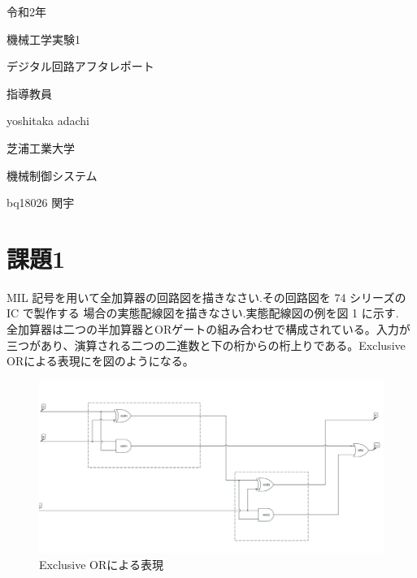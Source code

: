 \documentclass[xelatex,ja=standard,jafont=noto]{bxjsarticle}
\date{May 2020}
\begin{document}
	\begin{titlepage}
			\begin{center}
				
				{\Large 令和2年}
				
				\vspace{10truept}
				
				{\Large 機械工学実験1}
				
				\vspace*{140truept}
				
				{\Huge デジタル回路アフタレポート} 
				
				\vspace{160truept}
				
				{\Large 指導教員}
				
				\vspace{10truept}
				
				{\Large yoshitaka adachi}
				
				\vspace{70truept}
				
				{\Large 芝浦工業大学}
				
				\vspace{10truept}
				
				{\Large 機械制御システム}
				
				\vspace{30truept}
				
				{\Large bq18026 関宇}      
				
			\end{center}
		\end{titlepage}








\section{課題1}
MIL 記号を用いて全加算器の回路図を描きなさい.その回路図を 74 シリーズの IC で製作する
場合の実態配線図を描きなさい.実態配線図の例を図 1 に示す.\\

全加算器は二つの半加算器とORゲートの組み合わせで構成されている。入力が三つがあり、演算される二つの二進数と下の桁からの桁上りである。Exclusive ORによる表現にを図のようになる。
		

\begin{figure}[h!]
    \centering
    \includegraphics[scale=0.4]{xor.png}
    \caption{Exclusive ORによる表現}
\end{figure}
\end{document}
